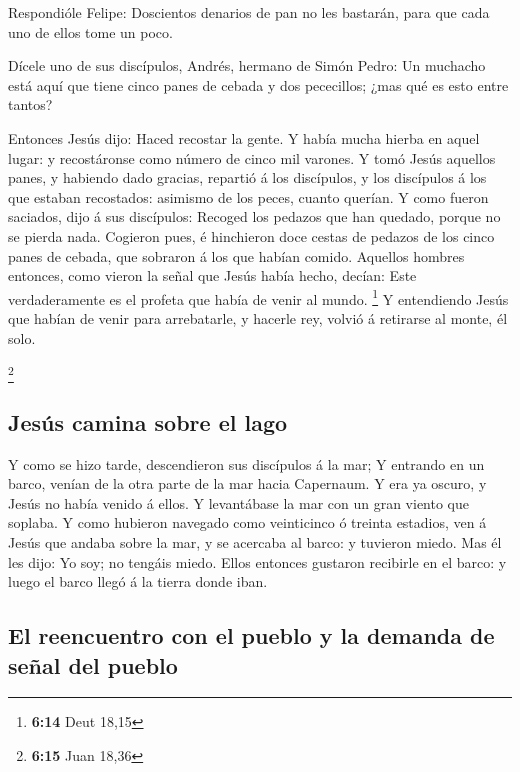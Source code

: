  Respondióle Felipe: Doscientos denarios de pan no les
bastarán, para que cada uno de ellos tome un poco.

 Dícele uno de sus discípulos, Andrés, hermano de Simón
Pedro:  Un muchacho está aquí que tiene cinco panes de
cebada y dos pececillos; ¿mas qué es esto entre tantos?

 Entonces Jesús dijo: Haced recostar la gente. Y había
mucha hierba en aquel lugar: y recostáronse como número de cinco mil
varones.  Y tomó Jesús aquellos panes, y habiendo dado
gracias, repartió á los discípulos, y los discípulos á los que estaban
recostados: asimismo de los peces, cuanto querían.  Y
como fueron saciados, dijo á sus discípulos: Recoged los pedazos que han
quedado, porque no se pierda nada.  Cogieron pues, é
hinchieron doce cestas de pedazos de los cinco panes de cebada, que
sobraron á los que habían comido.  Aquellos hombres
entonces, como vieron la señal que Jesús había hecho, decían: Este
verdaderamente es el profeta que había de venir al mundo. \footnote{\textbf{6:14}
  Deut 18,15}  Y entendiendo Jesús que habían de venir
para arrebatarle, y hacerle rey, volvió á retirarse al monte, él solo.

\footnote{\textbf{6:15} Juan 18,36}

\hypertarget{jesuxfas-camina-sobre-el-lago}{%
\subsection{Jesús camina sobre el
lago}\label{jesuxfas-camina-sobre-el-lago}}

 Y como se hizo tarde, descendieron sus discípulos á la
mar;  Y entrando en un barco, venían de la otra parte de
la mar hacia Capernaum. Y era ya oscuro, y Jesús no había venido á
ellos.  Y levantábase la mar con un gran viento que
soplaba.  Y como hubieron navegado como veinticinco ó
treinta estadios, ven á Jesús que andaba sobre la mar, y se acercaba al
barco: y tuvieron miedo.  Mas él les dijo: Yo soy; no
tengáis miedo.  Ellos entonces gustaron recibirle en el
barco: y luego el barco llegó á la tierra donde iban.

\hypertarget{el-reencuentro-con-el-pueblo-y-la-demanda-de-seuxf1al-del-pueblo}{%
\subsection{El reencuentro con el pueblo y la demanda de señal del
pueblo}\label{el-reencuentro-con-el-pueblo-y-la-demanda-de-seuxf1al-del-pueblo}}

